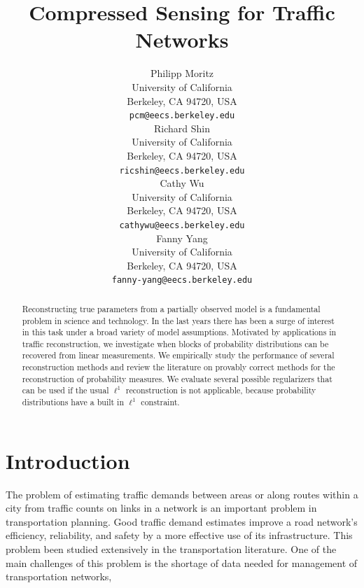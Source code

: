 \documentclass{article} %
\begin{document}
\title{Compressed Sensing for Traffic Networks}

\author{
Philipp Moritz\\
University of California\\
Berkeley, CA 94720, USA\\
\texttt{pcm@eecs.berkeley.edu}\\
\And
Richard Shin\\
University of California\\
Berkeley, CA 94720, USA\\
\texttt{ricshin@eecs.berkeley.edu}\\
\And
Cathy Wu\\
University of California\\
Berkeley, CA 94720, USA\\
\texttt{cathywu@eecs.berkeley.edu}\\
\And
Fanny Yang\\
University of California\\
Berkeley, CA 94720, USA\\
\texttt{fanny-yang@eecs.berkeley.edu} \\
}

\maketitle

\begin{abstract}
Reconstructing true parameters from a partially observed model is a fundamental problem in science and technology.
In the last years there has been a surge of interest in this task under a broad variety of model assumptions.
Motivated by applications in traffic reconstruction, we investigate when blocks of probability distributions can be recovered from linear measurements.
We empirically study the performance of several reconstruction methods and review the literature on provably correct methods for the reconstruction of probability measures.
We evaluate several possible regularizers that can be used if the usual $\ell^1$ reconstruction is not applicable, because probability distributions have a built in $\ell^1$ constraint.
\end{abstract}

\section{Introduction}
The problem of estimating traffic demands between areas or along routes within a city from traffic counts on links in a network is an important problem in transportation planning. Good traffic demand estimates improve a road network's efficiency, reliability, and safety by a more effective use of its infrastructure. This problem been studied extensively in the transportation literature. One of the main challenges of this problem is the shortage of data needed for management of transportation networks, 
\end{document}
